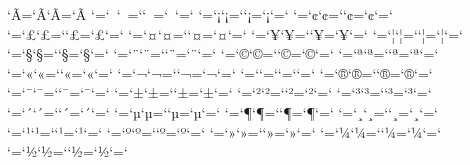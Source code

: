 \lccode`^^c3=`^^c3\uccode`^^c3=`^^c3 %
\lccode`^^80=`^^a0\uccode`^^a0=`^^80\lccode`^^a0=`^^a0\uccode`^^80=`^^80 %
\lccode`^^81=`^^a1\uccode`^^a1=`^^81\lccode`^^a1=`^^a1\uccode`^^81=`^^81 %
\lccode`^^82=`^^a2\uccode`^^a2=`^^82\lccode`^^a2=`^^a2\uccode`^^82=`^^82 %
\lccode`^^83=`^^a3\uccode`^^a3=`^^83\lccode`^^a3=`^^a3\uccode`^^83=`^^83 %
\lccode`^^84=`^^a4\uccode`^^a4=`^^84\lccode`^^a4=`^^a4\uccode`^^84=`^^84 %
\lccode`^^85=`^^a5\uccode`^^a5=`^^85\lccode`^^a5=`^^a5\uccode`^^85=`^^85 %
\lccode`^^86=`^^a6\uccode`^^a6=`^^86\lccode`^^a6=`^^a6\uccode`^^86=`^^86 %
\lccode`^^87=`^^a7\uccode`^^a7=`^^87\lccode`^^a7=`^^a7\uccode`^^87=`^^87 %
\lccode`^^88=`^^a8\uccode`^^a8=`^^88\lccode`^^a8=`^^a8\uccode`^^88=`^^88 %
\lccode`^^89=`^^a9\uccode`^^a9=`^^89\lccode`^^a9=`^^a9\uccode`^^89=`^^89 %
\lccode`^^8a=`^^aa\uccode`^^aa=`^^8a\lccode`^^aa=`^^aa\uccode`^^8a=`^^8a %
\lccode`^^8b=`^^ab\uccode`^^ab=`^^8b\lccode`^^ab=`^^ab\uccode`^^8b=`^^8b %
\lccode`^^8c=`^^ac\uccode`^^ac=`^^8c\lccode`^^ac=`^^ac\uccode`^^8c=`^^8c %
\lccode`^^8d=`^^ad\uccode`^^ad=`^^8d\lccode`^^ad=`^^ad\uccode`^^8d=`^^8d %
\lccode`^^8e=`^^ae\uccode`^^ae=`^^8e\lccode`^^ae=`^^ae\uccode`^^8e=`^^8e %
\lccode`^^8f=`^^af\uccode`^^af=`^^8f\lccode`^^af=`^^af\uccode`^^8f=`^^8f %
\lccode`^^91=`^^b1\uccode`^^b1=`^^91\lccode`^^b1=`^^b1\uccode`^^91=`^^91 %
\lccode`^^92=`^^b2\uccode`^^b2=`^^92\lccode`^^b2=`^^b2\uccode`^^92=`^^92 %
\lccode`^^93=`^^b3\uccode`^^b3=`^^93\lccode`^^b3=`^^b3\uccode`^^93=`^^93 %
\lccode`^^94=`^^b4\uccode`^^b4=`^^94\lccode`^^b4=`^^b4\uccode`^^94=`^^94 %
\lccode`^^95=`^^b5\uccode`^^b5=`^^95\lccode`^^b5=`^^b5\uccode`^^95=`^^95 %
\lccode`^^96=`^^b6\uccode`^^b6=`^^96\lccode`^^b6=`^^b6\uccode`^^96=`^^96 %
\lccode`^^98=`^^b8\uccode`^^b8=`^^98\lccode`^^b8=`^^b8\uccode`^^98=`^^98 %
\lccode`^^99=`^^b9\uccode`^^b9=`^^99\lccode`^^b9=`^^b9\uccode`^^99=`^^99 %
\lccode`^^9a=`^^ba\uccode`^^ba=`^^9a\lccode`^^ba=`^^ba\uccode`^^9a=`^^9a %
\lccode`^^9b=`^^bb\uccode`^^bb=`^^9b\lccode`^^bb=`^^bb\uccode`^^9b=`^^9b %
\lccode`^^9c=`^^bc\uccode`^^bc=`^^9c\lccode`^^bc=`^^bc\uccode`^^9c=`^^9c %
\lccode`^^9d=`^^bd\uccode`^^bd=`^^9d\lccode`^^bd=`^^bd\uccode`^^9d=`^^9d %

